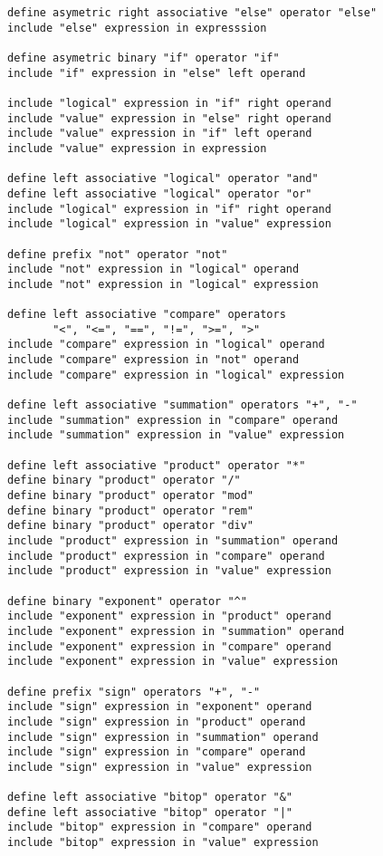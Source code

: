 \documentclass[12pt]{article}
\newenvironment{indpar}[1][0.3in]%
	{\begin{list}{}%
		     {\setlength{\itemsep}{0in}%
		      \setlength{\topsep}{0in}%
		      \setlength{\parsep}{1ex}%
		      \setlength{\labelwidth}{#1}%
		      \setlength{\leftmargin}{#1}%
		      \addtolength{\leftmargin}{\labelsep}}%
	 \item}%
	{\end{list}}
\begin{document}
\begin{indpar}\begin{verbatim}
define asymetric right associative "else" operator "else"
include "else" expression in expresssion

define asymetric binary "if" operator "if"
include "if" expression in "else" left operand

include "logical" expression in "if" right operand
include "value" expression in "else" right operand
include "value" expression in "if" left operand
include "value" expression in expression

define left associative "logical" operator "and"
define left associative "logical" operator "or"
include "logical" expression in "if" right operand
include "logical" expression in "value" expression

define prefix "not" operator "not"
include "not" expression in "logical" operand
include "not" expression in "logical" expression

define left associative "compare" operators
       "<", "<=", "==", "!=", ">=", ">"
include "compare" expression in "logical" operand
include "compare" expression in "not" operand
include "compare" expression in "logical" expression

define left associative "summation" operators "+", "-"
include "summation" expression in "compare" operand
include "summation" expression in "value" expression

define left associative "product" operator "*"
define binary "product" operator "/"
define binary "product" operator "mod"
define binary "product" operator "rem"
define binary "product" operator "div"
include "product" expression in "summation" operand
include "product" expression in "compare" operand
include "product" expression in "value" expression

define binary "exponent" operator "^"
include "exponent" expression in "product" operand
include "exponent" expression in "summation" operand
include "exponent" expression in "compare" operand
include "exponent" expression in "value" expression

define prefix "sign" operators "+", "-"
include "sign" expression in "exponent" operand
include "sign" expression in "product" operand
include "sign" expression in "summation" operand
include "sign" expression in "compare" operand
include "sign" expression in "value" expression

define left associative "bitop" operator "&"
define left associative "bitop" operator "|"
include "bitop" expression in "compare" operand
include "bitop" expression in "value" expression


\end{verbatim}
\end{indpar}
\end{document}
